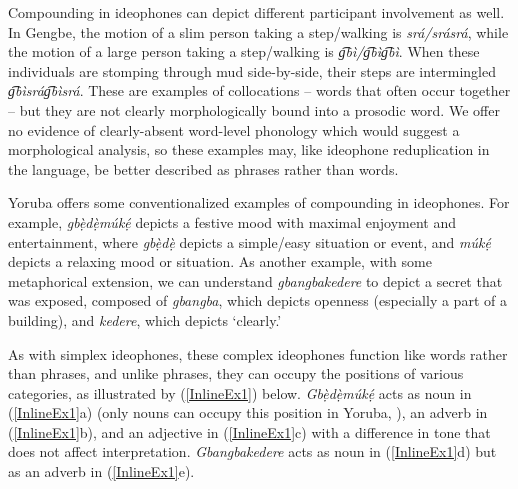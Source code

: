 \documentclass[output=paper,colorlinks,citecolor=brown]{langscibook}
\begin{document}
Compounding  in ideophones can depict different participant involvement as well. In Gengbe, the motion of a slim person taking a step/walking is \textit{srá/srásrá}, while the motion of a large person taking a step/walking is \textit{g͡bì/g͡bìg͡bì}. When these individuals are stomping through mud side-by-side, their steps are intermingled \textit{g͡bìsrág͡bìsrá}. These are examples of collocations -- words that often occur together -- but they are not clearly morphologically bound into a prosodic word. We offer no evidence of clearly-absent word-level phonology which would suggest a morphological analysis, so these examples may, like ideophone reduplication in the language, be better described as phrases rather than words.

Yoruba offers some conventionalized examples of compounding in ideophones. For example, \textit{gbẹ̀dẹ̀múkẹ́} depicts a festive mood with maximal enjoyment and entertainment, where \textit{gbẹ̀dẹ̀} depicts a simple/easy situation or event, and \textit{múkẹ́} depicts a relaxing mood or situation. As another example, with some metaphorical extension, we can understand \textit{gbangbakedere} to depict a secret that was exposed, composed of \textit{gbangba}, which depicts openness (especially a part of a building), and \textit{kedere}, which depicts ‘clearly.' 

As with simplex ideophones, these complex ideophones function like words rather than phrases, and unlike phrases, they can occupy the positions of various categories, as illustrated by (\ref{InlineEx1}) below. \textit{Gbẹ̀dẹ̀múkẹ́} acts as noun in (\ref{InlineEx1}a) (only nouns can occupy this position in Yoruba, \citealt{Bamgbose1990}), an adverb in (\ref{InlineEx1}b), and an adjective in (\ref{InlineEx1}c) with a difference in tone that does not affect interpretation. \textit{Gbangbakedere} acts as noun in (\ref{InlineEx1}d) but as an adverb in (\ref{InlineEx1}e). 
\end{document}
